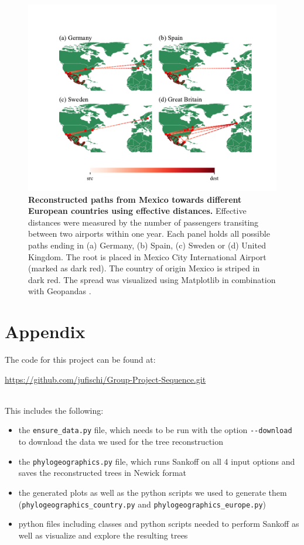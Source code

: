 \documentclass{article}
\begin{document}
\begin{figure}[h!]
    \centering
    \includegraphics[width=\linewidth,trim={0.5cm 0 0.5cm 0}]{airport_effective_europe.pdf}
    \caption{\textbf{Reconstructed paths from Mexico towards different European countries using effective distances.} Effective distances were measured by the number of passengers transiting between two airports within one year. Each panel holds all possible paths ending in (a) Germany, (b) Spain, (c) Sweden or (d) United Kingdom. The root is placed in Mexico City International Airport (marked as dark red). The country of origin Mexico is striped in dark red. The spread was visualized using Matplotlib \cite{MatplotlibVisualizationPython} in combination with Geopandas \cite{GeoPandas12GeoPandas}.}%
    \label{fig:Europe}
\end{figure}

\newpage
  
 

\newpage
\appendix
\section*{Appendix}
The code for this project can be found at:

\url{https://github.com/jufischi/Group-Project-Sequence.git}

\ \\

This includes the following:
\begin{itemize}
    \item the \texttt{ensure\_data.py} file, which needs to be run with the option \texttt{-\texttt{-}download} to download the data we used for the tree reconstruction
    \item the \texttt{phylogeographics.py} file, which runs Sankoff on all 4 input options and saves the reconstructed trees in Newick format
    \item the generated plots as well as the python scripts we used to generate them (\texttt{phylogeographics\_country.py} and \texttt{phylogeographics\_europe.py})
    \item python files including classes and python scripts needed to perform Sankoff as well as visualize and explore the resulting trees
\end{itemize} 
\end{document}
